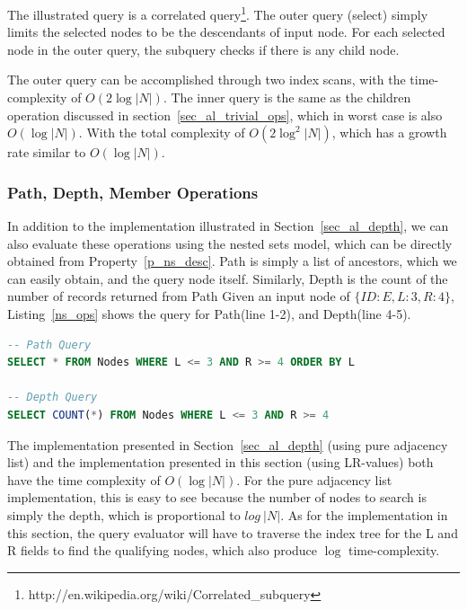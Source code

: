 The illustrated query is a correlated query\footnote{http://en.wikipedia.org/wiki/Correlated\_subquery}. The outer query (select) simply limits the selected nodes to be the descendants of input node. For each selected node in the outer query, the subquery checks if there is any child node.

The outer query can be accomplished through two index scans, with the time-complexity of $O(2\log |N|)$. The inner query is the same as the children operation discussed in section~\ref{sec_al_trivial_ops}, which in worst case is also $O(\log |N|)$. With the total complexity of $O(2\log^2 |N|)$, which has a growth rate similar to $O(\log |N|)$.


\subsubsection{Path, Depth, Member Operations}

In addition to the implementation illustrated in Section~\ref{sec_al_depth}, we can also evaluate these operations using the nested sets model, which can be directly obtained from Property~\ref{p_ns_desc}. Path is simply a list of ancestors, which we can easily obtain, and the query node itself. Similarly, Depth is the count of the number of records returned from Path Given an input node of $\{ID:E, L:3, R:4\}$, Listing~\ref{ns_ops} shows the query for Path(line 1-2), and Depth(line 4-5).

\begin{lstlisting}[language=sql,caption={Path, Depth, Member Operations},label=ns_ops]
-- Path Query
SELECT * FROM Nodes WHERE L <= 3 AND R >= 4 ORDER BY L

-- Depth Query
SELECT COUNT(*) FROM Nodes WHERE L <= 3 AND R >= 4
\end{lstlisting}

The implementation presented in Section~\ref{sec_al_depth} (using pure adjacency list) and the implementation presented in this section (using LR-values) both have the time complexity of $O(\log |N|)$. For the pure adjacency list implementation, this is easy to see because the number of nodes to search is simply the depth, which is proportional to $log\ |N|$.  As for the implementation in this section, the query evaluator will have to traverse the index tree for the L and R fields to find the qualifying nodes, which also produce $\log$ time-complexity.

